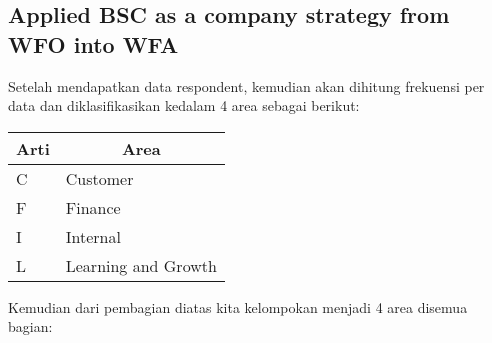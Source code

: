 \documentclass[conference]{IEEEtran}
\begin{document}
\subsection{Applied BSC as a company strategy from WFO into WFA}

Setelah mendapatkan data respondent, kemudian akan dihitung frekuensi per data dan diklasifikasikan kedalam 4 area sebagai berikut:



 \label{tab:title} 

\begin{table}[h]
\center
 \begin{tabular}{|l|l|}
\hline
\multicolumn{1}{|c|}{Arti} & \multicolumn{1}{c|}{Area} \\ \hline
C                          & Customer                  \\ \hline
F                          & Finance                   \\ \hline
I                          & Internal                  \\ \hline
L                          & Learning and Growth       \\ \hline
\end{tabular}

\end{table}



\text Kemudian dari pembagian diatas kita kelompokan menjadi 4 area disemua bagian:


 \label{tab:title} 
\end{document}
